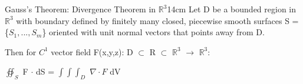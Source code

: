     \begin{wtheorem}{Gauss's Theorem: Divergence Theorem in $\mathbb{R}^3$}{14cm}
        Let D be a bounded region in $\mathbb{R}^3$ with boundary defined
        by finitely many closed, piecewise smooth surfaces S = \{$S_1,...,S_m$\}
        oriented with unit normal vectors that points away from D.

        Then for $C^1$ vector field F(x,y,z): D $\subset$ R $\subset$
        $\mathbb{R}^3$ $\rightarrow$ $\mathbb{R}^3$:

        \hspace{0.5cm}
        $\oiint_S$ F $\cdot$ dS
        = $\int \int \int_D$ $\nabla \cdot F$ dV
    \end{wtheorem}






























